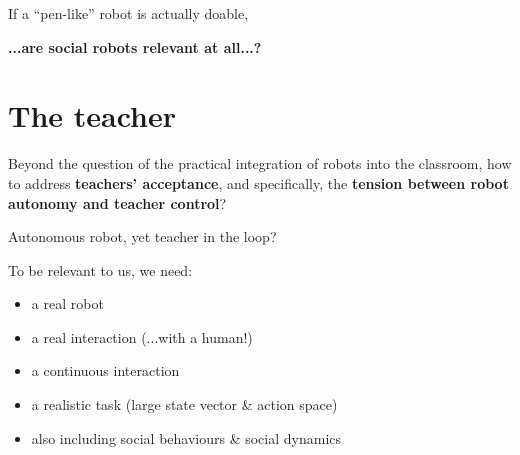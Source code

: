 \documentclass[compress]{beamer}
\begin{document}
 \begin{frame}[plain]{}

     \centering
    If a ``pen-like'' robot is actually doable,


     \Large\bf
     ...are social robots relevant at all...?
 \end{frame}

%

\section{The teacher}


{
\begin{frame}[plain]
    \Large
    Beyond the question of the practical integration of robots into the
    classroom, how to address \textbf{teachers' acceptance}, and specifically, the \textbf{tension between robot autonomy and teacher
    control}?

\end{frame}
}


\begin{frame}{Autonomous robot, yet teacher in the loop?}

    To be relevant to us, we need:
    
    \begin{itemize}
        \item<+-> a real robot
        \item<+-> a real interaction (...with a human!)
        \item<+-> a continuous interaction
        \item<+-> a realistic task (large state vector \& action space)
        \item<+-> also including social behaviours \& social dynamics
    \end{itemize}

\end{frame}
\end{document}
